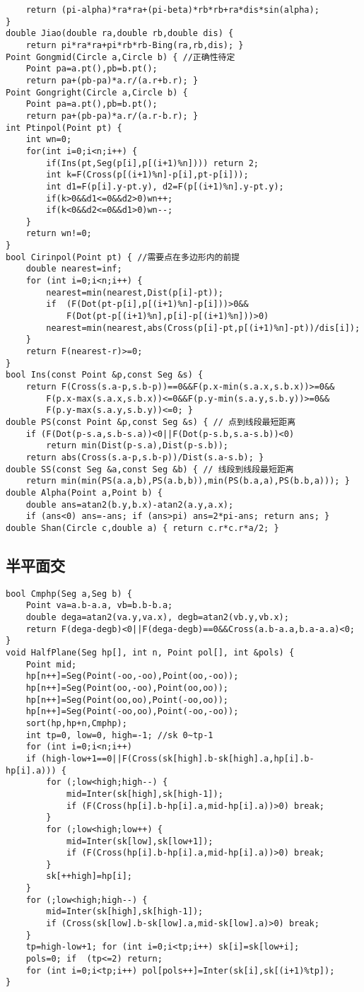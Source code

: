 \documentclass{article}
\begin{document}
\begin{lstlisting}
	return (pi-alpha)*ra*ra+(pi-beta)*rb*rb+ra*dis*sin(alpha);
}
double Jiao(double ra,double rb,double dis) {
	return pi*ra*ra+pi*rb*rb-Bing(ra,rb,dis); }
Point Gongmid(Circle a,Circle b) { //正确性待定
	Point pa=a.pt(),pb=b.pt();
	return pa+(pb-pa)*a.r/(a.r+b.r); }
Point Gongright(Circle a,Circle b) {
	Point pa=a.pt(),pb=b.pt();
	return pa+(pb-pa)*a.r/(a.r-b.r); }
int Ptinpol(Point pt) {
	int wn=0;
    for(int i=0;i<n;i++) {
        if(Ins(pt,Seg(p[i],p[(i+1)%n]))) return 2;
        int k=F(Cross(p[(i+1)%n]-p[i],pt-p[i]));
        int d1=F(p[i].y-pt.y), d2=F(p[(i+1)%n].y-pt.y);
        if(k>0&&d1<=0&&d2>0)wn++;
        if(k<0&&d2<=0&&d1>0)wn--;
    }
    return wn!=0;
}
bool Cirinpol(Point pt) { //需要点在多边形内的前提
	double nearest=inf;
	for (int i=0;i<n;i++) {
		nearest=min(nearest,Dist(p[i]-pt));
		if  (F(Dot(pt-p[i],p[(i+1)%n]-p[i]))>0&&
			F(Dot(pt-p[(i+1)%n],p[i]-p[(i+1)%n]))>0)
		nearest=min(nearest,abs(Cross(p[i]-pt,p[(i+1)%n]-pt))/dis[i]);
	}
	return F(nearest-r)>=0;
}
bool Ins(const Point &p,const Seg &s) {
	return F(Cross(s.a-p,s.b-p))==0&&F(p.x-min(s.a.x,s.b.x))>=0&&
		F(p.x-max(s.a.x,s.b.x))<=0&&F(p.y-min(s.a.y,s.b.y))>=0&&
		F(p.y-max(s.a.y,s.b.y))<=0; }
double PS(const Point &p,const Seg &s) { // 点到线段最短距离
	if (F(Dot(p-s.a,s.b-s.a))<0||F(Dot(p-s.b,s.a-s.b))<0)
		return min(Dist(p-s.a),Dist(p-s.b));
	return abs(Cross(s.a-p,s.b-p))/Dist(s.a-s.b); }
double SS(const Seg &a,const Seg &b) { // 线段到线段最短距离
	return min(min(PS(a.a,b),PS(a.b,b)),min(PS(b.a,a),PS(b.b,a))); }
double Alpha(Point a,Point b) {
	double ans=atan2(b.y,b.x)-atan2(a.y,a.x);
	if (ans<0) ans=-ans; if (ans>pi) ans=2*pi-ans; return ans; }
double Shan(Circle c,double a) { return c.r*c.r*a/2; }
\end{lstlisting}

\subsection{半平面交}
\begin{lstlisting}
bool Cmphp(Seg a,Seg b) {
	Point va=a.b-a.a, vb=b.b-b.a;
    double dega=atan2(va.y,va.x), degb=atan2(vb.y,vb.x);
	return F(dega-degb)<0||F(dega-degb)==0&&Cross(a.b-a.a,b.a-a.a)<0;
}
void HalfPlane(Seg hp[], int n, Point pol[], int &pols) {
	Point mid;
	hp[n++]=Seg(Point(-oo,-oo),Point(oo,-oo));
	hp[n++]=Seg(Point(oo,-oo),Point(oo,oo));
	hp[n++]=Seg(Point(oo,oo),Point(-oo,oo));
	hp[n++]=Seg(Point(-oo,oo),Point(-oo,-oo));
	sort(hp,hp+n,Cmphp);
	int tp=0, low=0, high=-1; //sk 0~tp-1
	for (int i=0;i<n;i++)
	if (high-low+1==0||F(Cross(sk[high].b-sk[high].a,hp[i].b-hp[i].a))) {
		for (;low<high;high--) {
			mid=Inter(sk[high],sk[high-1]);
			if (F(Cross(hp[i].b-hp[i].a,mid-hp[i].a))>0) break;
		}
		for (;low<high;low++) {
			mid=Inter(sk[low],sk[low+1]);
			if (F(Cross(hp[i].b-hp[i].a,mid-hp[i].a))>0) break;
		}
		sk[++high]=hp[i];
	}
	for (;low<high;high--) {
		mid=Inter(sk[high],sk[high-1]);
		if (Cross(sk[low].b-sk[low].a,mid-sk[low].a)>0) break;
	}
	tp=high-low+1; for (int i=0;i<tp;i++) sk[i]=sk[low+i];
	pols=0; if  (tp<=2) return;
	for (int i=0;i<tp;i++) pol[pols++]=Inter(sk[i],sk[(i+1)%tp]);
}
\end{lstlisting}
\end{document}
